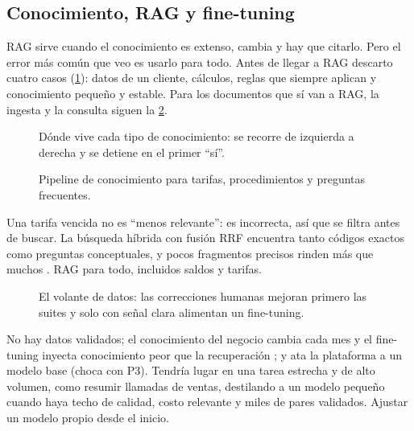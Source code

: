 \subsection{Conocimiento, RAG y fine-tuning}
\label{sec:conocimiento}
RAG \citep{lewis2020rag} sirve cuando el conocimiento es extenso, cambia y hay que citarlo.
Pero el error más común que veo es usarlo para todo. Antes de llegar a RAG descarto cuatro
casos (\cref{fig:conocimiento}): datos de un cliente, cálculos, reglas que siempre aplican y
conocimiento pequeño y estable. Para los documentos que sí van a RAG, la ingesta y la consulta
siguen la \cref{fig:ingesta}.
\begin{figure}[!htbp]
  \centering
  
  \caption{Dónde vive cada tipo de conocimiento: se recorre de izquierda a derecha y se
  detiene en el primer ``sí''.}
  \label{fig:conocimiento}
\end{figure}

\begin{figure}[!htbp]
  \centering
  
  \caption{Pipeline de conocimiento para tarifas, procedimientos y preguntas frecuentes.}
  \label{fig:ingesta}
\end{figure}

{Una tarifa vencida no es ``menos relevante'': es incorrecta, así que se filtra antes de
buscar. La búsqueda híbrida con fusión RRF \citep{cormack2009rrf} encuentra tanto códigos
exactos como preguntas conceptuales, y pocos fragmentos precisos rinden más que muchos
\citep{liu2024lost}.}
{RAG para todo, incluidos saldos y tarifas.}

\begin{figure}[!htbp]
  \centering
  
  \caption{El volante de datos: las correcciones humanas mejoran primero las suites y solo
  con señal clara alimentan un fine-tuning.}
  \label{fig:volante}
\end{figure}

{No hay datos validados; el conocimiento del negocio cambia cada mes y el fine-tuning inyecta
conocimiento peor que la recuperación \citep{ovadia2024ftrag,gekhman2024newknowledge}; y ata
la plataforma a un modelo base (choca con P3). Tendría lugar en una tarea estrecha y de alto
volumen, como resumir llamadas de ventas, destilando a un modelo pequeño
\citep{hu2022lora,hsieh2023distilling} cuando haya techo de calidad, costo relevante y miles
de pares validados.}
{Ajustar un modelo propio desde el inicio.}

